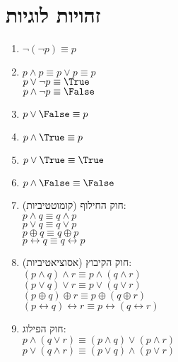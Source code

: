 \documentclass{article}
\begin{document}
\section*{זהויות לוגיות}
\noindent \begin{enumerate}[label=.\arabic*]
    \item $\neg \left(\neg p \right) \equiv p $

    \item $p \land p \equiv p \lor p \equiv p$ \\
          $p \lor \neg p \equiv \True$ \\
          $p \land \neg p \equiv \False$

    \item $p \lor \False \equiv p$

    \item $p \land \True \equiv p$

    \item $p \lor \True \equiv \True$

    \item $p \land \False \equiv \False$

    \item חוק החילוף (קומוטטיביות): \\
          $p \land q \equiv q \land p$ \\
          $p \lor q \equiv q \lor p$ \\
          $p \oplus q \equiv q \oplus p$ \\
          $p \leftrightarrow q \equiv q \leftrightarrow p$

    \item חוק הקיבוץ (אסוציאטיביות): \\
          $\left( p \land q \right) \land r \equiv p \land \left( q \land r \right) $ \\
          $\left( p \lor q \right) \lor r \equiv p \lor \left( q \lor r \right) $ \\
          $\left( p \oplus q \right) \oplus r \equiv p \oplus \left( q \oplus r \right)$ \\
          $\left( p \leftrightarrow q \right) \leftrightarrow r \equiv p \leftrightarrow \left( q \leftrightarrow r \right)$

    \item חוק הפילוג: \\
          $p \land \left( q \lor r \right) \equiv \left( p \land q \right) \lor \left( p \land r \right)$ \\
          $p \lor \left( q \land r \right) \equiv \left( p \lor q \right) \land \left( p \lor r \right)$


\end{enumerate}
\end{document}
